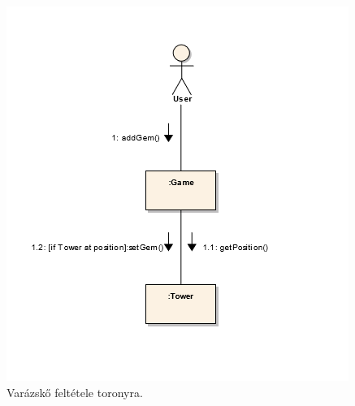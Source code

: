 \begin{figure}[H]
\begin{center}
\includegraphics{images/ch05/addGemToTowerKomm.png}
\caption{Varázskő feltétele toronyra.}
\label{fig:addGemToTowerKomm}
\end{center}
\end{figure}